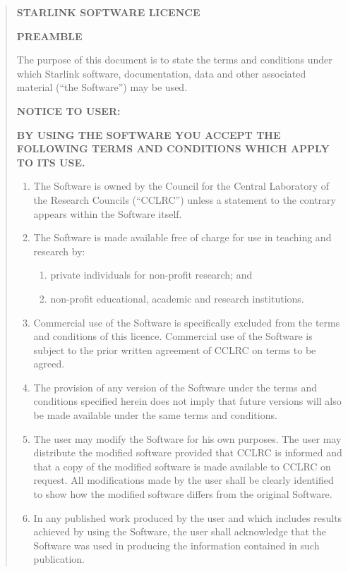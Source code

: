 \documentclass[twoside,11pt]{article}
\renewcommand{\_}{\texttt{\symbol{95}}}
\newcommand{\latexonlysmall}{\small}
\newcommand{\latexonlysmall}{}
\begin{document}
\begin{quote}
\latexonlysmall
\begin{center}\textbf{STARLINK SOFTWARE LICENCE}\end{center}
 
\textbf{PREAMBLE}

The purpose of this document is to state the terms and conditions
under which Starlink software, documentation, data and other associated
material (``the Software'') may be used.
\par 
\textbf{NOTICE TO USER:}
\par 
\textbf{BY USING THE SOFTWARE YOU ACCEPT THE FOLLOWING TERMS AND CONDITIONS
WHICH APPLY TO ITS USE.}
 
\begin{enumerate}
\item The Software is owned by the Council for the Central Laboratory of the
Research Councils (``CCLRC'') unless a statement to the contrary appears
within the Software itself.
 
\item The Software is made available free of charge for use in teaching and
research by:
\begin{enumerate}
\item private individuals for non-profit research; and
\item non-profit educational, academic and research institutions.
\end{enumerate}
 
\item Commercial use of the Software is specifically excluded from the terms
and conditions of this licence.  Commercial use of the Software is subject
to the prior written agreement of CCLRC on terms to be agreed.
 
\item The provision of any version of the Software under the terms and
conditions specified herein does not imply that future versions will also
be made available under the same terms and conditions.
 
\item The user may modify the Software for his own purposes.  The user may
distribute the modified software provided that CCLRC is informed and that
a copy of the modified software is made available to CCLRC on request.
All modifications made by the user shall be clearly identified to show how
the modified software differs from the original Software.
 
\item In any published work produced by the user and which includes results
achieved by using the Software, the user shall acknowledge that the Software
was used in producing the information contained in such publication.
 

\end{enumerate}
\end{quote}
\end{document}
